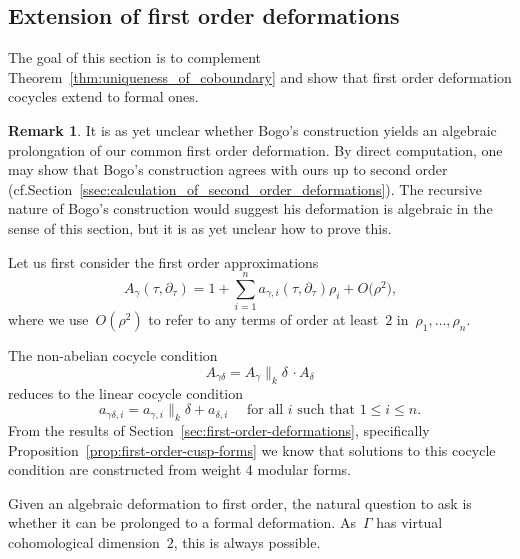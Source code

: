 \documentclass[JEP,XML,SOM,Unicode,published]{cedram}
\theoremstyle{plain}
\theoremstyle{definition}
\newtheorem{remark}[theoremcounter]{Remark}
\newcommand{\tx}{\text}
\let\Ga\Gamma
\let\ga\gamma
\begin{document}
\subsection{Extension of first order deformations}
\label{ssec:extension_first_order_deformations}

The goal of this section is to complement Theorem~\ref{thm:uniqueness_of_coboundary} and show that first order deformation cocycles extend to formal ones.

\begin{remark}
It is as yet unclear whether Bogo's construction yields an algebraic prolongation of our common first order deformation. By direct computation, one may show that Bogo's construction agrees with ours up to second order (cf.\@ Section~\ref{ssec:calculation_of_second_order_deformations}). The recursive nature of Bogo's construction would suggest his deformation is algebraic in the sense of this section, but it is as yet unclear how to prove this.
\end{remark}

Let us first consider the first order approximations
\begin{equation*}
A_\ga(\tau, \partial_\tau)
=
1
+
\sum_{i=1}^n
a_{\ga,i}(\tau, \partial_\tau) \rho_i
+
O\bigl(\rho^2 \bigr)
\tx{,}
\end{equation*}
where we use~$O(\rho^2)$ to refer to any terms of order at least~$2$ in~$\rho_1,\ldots,\rho_n$.

The non-abelian cocycle condition
\begin{equation*}A_{\ga\delta} = A_{\ga}\big\|_k\delta\,\cdot A_\delta\end{equation*}
reduces to the linear cocycle condition
\begin{equation*}
a_{\ga\delta,i} = a_{\ga,i}\big\|_k\delta + a_{\delta,i}
\quad\text{ for all $i$ such that }1\leq i \leq n
\tx{.}
\end{equation*}
From the results of Section~\ref{sec:first-order-deformations}, specifically Proposition~\ref{prop:first-order-cusp-forms} we know that solutions to this cocycle condition are constructed from weight 4 modular forms.

Given an algebraic deformation to first order, the natural question to ask is whether it can be prolonged to a formal deformation. As~$\Ga$ has virtual cohomological dimension~$2$, this is always possible.
\end{document}
